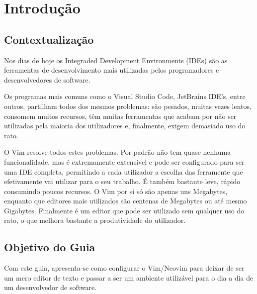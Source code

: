 \chapter{Introdução}
\label{chap:introducao}

\section{Contextualização}
\label{sec:contextualizacao}

Nos dias de hoje os Integraded Development Environments (IDEs) são as ferramentas de desenvolvimento mais utilizadas pelos programadores e desenvolvedores de software.

Os programas mais comuns como o Visual Studio Code, JetBrains IDE's, entre outros, partilham todos dos mesmos problemas: são pesados, muitas vezes lentos, consomem muitos recursos, têm muitas ferramentas que acabam por não ser utilizadas pela maioria dos utilizadores e, finalmente, exigem demasiado uso do rato.

O Vim resolve todos estes problemas. Por padrão não tem quase nenhuma funcionalidade, mas é extremamente extensível e pode ser configurado para ser uma IDE completa, permitindo a cada utilizador a escolha das ferramente que efetivamente vai utilizar para o seu trabalho. É também bastante leve, rápido consumindo poucos recursos. O Vim por si só são apenas uns Megabytes, enquanto que editores mais utilizados são centenas de Megabytes ou até mesmo Gigabytes. Finalmente é um editor que pode ser utilizado sem qualquer uso do rato, o que melhora bastante a produtividade do utilizador.

\section{Objetivo do Guia}
\label{sec:objetivo-do-guia}

Com este guia, apresenta-se como configurar o Vim/Neovim para deixar de ser um mero editor de texto e passar a ser um ambiente utilizável para o dia a dia de um desenvolvedor de software.
